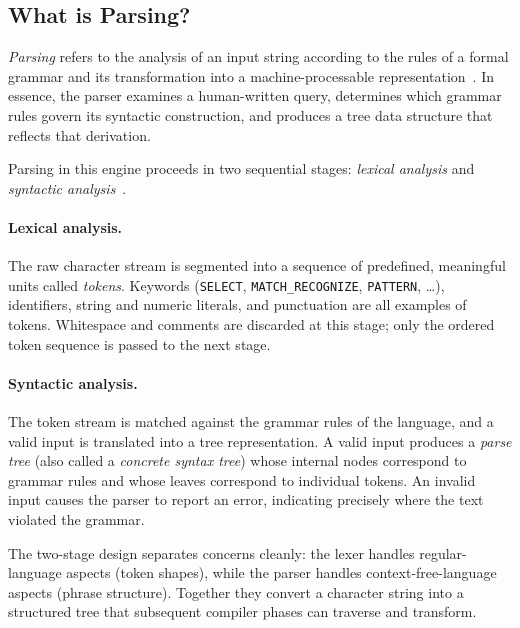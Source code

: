 \subsection{What is Parsing?}
\label{subsec:meth-what-parsing}

\emph{Parsing} refers to the analysis of an input string according to the
rules of a formal grammar and its transformation into a
machine-processable representation~\cite{mogensen2024compiler}.  In essence,
the parser examines a human-written query, determines which grammar rules
govern its syntactic construction, and produces a tree data structure that
reflects that derivation.

Parsing in this engine proceeds in two sequential stages:
\emph{lexical analysis} and \emph{syntactic analysis}~\cite{DragonBook}.

\paragraph{Lexical analysis.}
The raw character stream is segmented into a sequence of predefined,
meaningful units called \emph{tokens}.  Keywords
(\texttt{SELECT}, \texttt{MATCH\_RECOGNIZE}, \texttt{PATTERN}, \ldots),
identifiers, string and numeric literals, and punctuation are all examples
of tokens.  Whitespace and comments are discarded at this stage; only the
ordered token sequence is passed to the next stage.

\paragraph{Syntactic analysis.}
The token stream is matched against the grammar rules of the language,
and a valid input is translated into a tree representation.  A valid
input produces a \emph{parse tree} (also called a \emph{concrete syntax
tree}) whose internal nodes correspond to grammar rules and whose leaves
correspond to individual tokens.  An invalid input causes the parser to
report an error, indicating precisely where the text violated the grammar.

The two-stage design separates concerns cleanly: the lexer handles
regular-language aspects (token shapes), while the parser handles
context-free-language aspects (phrase structure).  Together they convert
a character string into a structured tree that subsequent compiler phases
can traverse and transform.

